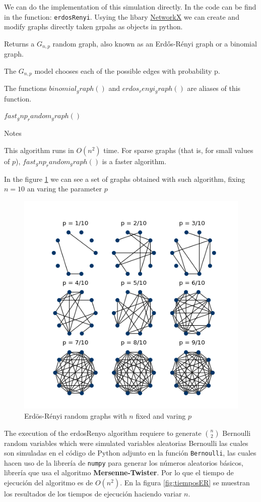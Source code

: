 We can do the implementation of this simulation directly. In the code can be find in the function: \texttt{erdosRenyi}. Usying the libary \href{https://networkx.github.io/}{NetworkX} we can create and modify graphs directly taken grpahs as objects in python.

Returns a $G_{n,p}$ random graph, also known as an Erdős-Rényi graph or a binomial graph.

The $G_{n,p}$ model chooses each of the possible edges with probability p.

The functions $binomial_graph()$ and $erdos_renyi_graph()$ are aliases of this function.


$fast_gnp_random_graph()$

Notes

This algorithm runs in $O(n^2)$ time. For sparse graphs (that is, for small values of $p$), $fast_gnp_random_graph()$ is a faster algorithm.

In the figure \ref{fig:ErdosRenyi10} we can see a set of graphs obtained with such algorithm, fixing $n=10$ an varing the parameter $p$
\begin{figure}[h!]
	\centering
	\includegraphics[scale=1]{Figures/ER-10.png}
	\caption{Erdös-Rényi random graphs with $n$ fixed and varing $p$}
	\label{fig:ErdosRenyi10}
\end{figure}
The execution of the erdosRenyo algorithm requiere to generate  $\binom{n}{2}$ Bernoulli random variables which were simulated variables aleatorias Bernoulli las cuales son simuladas en el código de Python adjunto en la función \texttt{Bernoulli}, las cuales hacen uso de la librería de \texttt{numpy} para generar los números aleatorios básicos, librería que usa el algoritmo \textbf{Mersenne-Twister}. Por lo que el tiempo de ejecución del algoritmo es de $O(n^{2})$. En la figura \ref{fig:tiemposER} se muestran los resultados de los tiempos de ejecución haciendo variar $n$.

